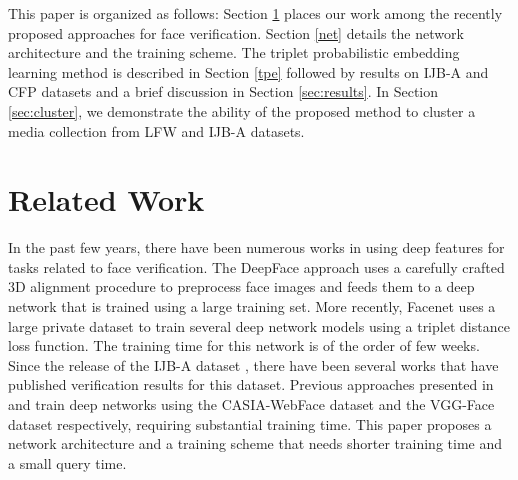 \documentclass[10pt,twocolumn,letterpaper]{article}
\begin{document}
This paper is organized as follows: Section \ref{SOA} places our work among the
recently proposed approaches for face verification. Section \ref{net} details
the network architecture and the training scheme. The triplet probabilistic
embedding learning method is described in Section \ref{tpe} followed by results
on IJB-A and CFP datasets and a brief discussion in Section
\ref{sec:results}. In Section \ref{sec:cluster}, we demonstrate the ability of
the proposed method to cluster a media collection from LFW and IJB-A
datasets.
 \section{Related Work}\label{SOA}
In the past few years, there have been numerous works in using deep features for tasks related to face verification. The DeepFace \cite{deepface14} approach uses a carefully crafted 3D alignment procedure to preprocess face images and feeds them to a deep network that is trained using a large training set. More recently, Facenet \cite{facenet15} uses a large private dataset to train several deep network models using a triplet distance loss function. The training time for this network is of the order of few weeks. Since the release of the IJB-A dataset \cite{ijba15}, there have been several works that have published verification results for this dataset. Previous approaches presented in \cite{wang15} and \cite{parkhi15} train deep networks using the CASIA-WebFace dataset \cite{casia14} and the VGG-Face dataset respectively, requiring substantial training time. This paper proposes a network architecture and a training scheme that needs shorter training time and a small query time. \\
\end{document}
